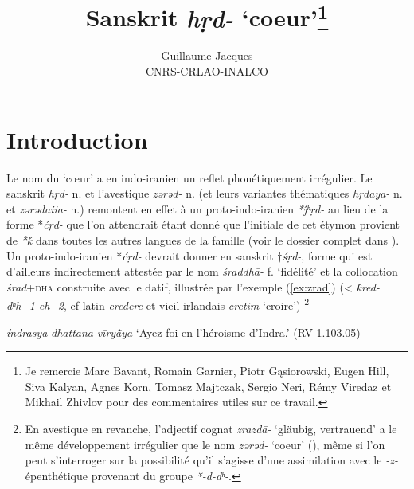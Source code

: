 \documentclass{article}
\newcommand{\ipa}[1]{{\phon\textit{#1}}}
\begin{document}
 
\title{Sanskrit \ipa{hṛd-} `coeur'\footnote{Je remercie 
Marc Bavant, Romain Garnier, Piotr Gąsiorowski, Eugen Hill, Siva Kalyan, Agnes Korn, Tomasz Majtczak, Sergio Neri, Rémy Viredaz et Mikhail Zhivlov pour des commentaires utiles sur ce travail.}}
\author{Guillaume Jacques\\ CNRS-CRLAO-INALCO}
\maketitle

\section*{Introduction}
Le nom du `cœur' a en indo-iranien un reflet phonétiquement irrégulier. Le sanskrit \ipa{hṛd-} n. et l'avestique \ipa{zərəd-} n. (et leurs variantes thématiques \ipa{hṛdaya-} n. et \ipa{zərədaiia-} n.) remontent en effet à un proto-indo-iranien \ipa{*j́ʰṛd-} au lieu de la forme *\ipa{ćṛd-} que l'on attendrait étant donné que l'initiale de cet étymon provient de \ipa{*ḱ} dans toutes les autres langues de la famille (voir le dossier complet dans \citealt[417-423]{wodtko08NIL}). Un proto-indo-iranien *\ipa{ćṛd-} devrait donner en sanskrit $\dagger$\ipa{śṛd-}, forme qui est d'ailleurs  indirectement attestée par le nom \ipa{śraddhā-} f. `fidélité' et la collocation \ipa{śrad}+\textsc{dha} construite avec le datif, illustrée par l'exemple (\ref{ex:zrad}) (< \ipa{k̂red-dʰh_1-eh_2}, cf latin \ipa{crēdere} et vieil irlandais \ipa{cretim} `croire') \footnote{En avestique en revanche, l'adjectif cognat \ipa{zrazdā-} `gläubig, vertrauend' a le même développement irrégulier que le nom \ipa{zərəd-} `coeur' (\citealt[663]{mayrhofer92ewa}), même si l'on peut s'interroger sur la possibilité qu'il s'agisse d'une assimilation avec le \ipa{-z-} épenthétique provenant du groupe \ipa{*-d-dʰ-}. }

\begin{exe}
\ex \label{ex:zrad}
\glt \ipa{śrád} \ipa{índrasya} \ipa{dhattana} \ipa{vīryā̀ya}
\glt `Ayez foi en l'héroisme d'Indra.' (RV 1.103.05)
\end{exe}
 
\end{document}
